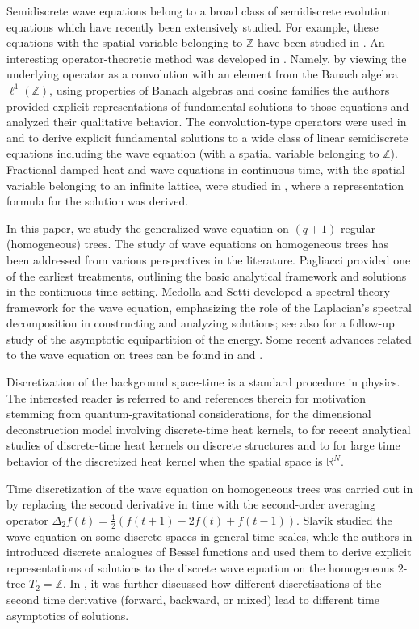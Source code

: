 \documentclass[12pt]{amsart}
\numberwithin{equation}{section}
\theoremstyle{boldremark}
\begin{document}
Semidiscrete wave equations belong to a broad class of semidiscrete evolution equations which have recently been extensively studied. For example, these equations with the spatial variable belonging to $\mathbb Z$ have been studied in \cite{G-CLM21, LM-A23, LM-A24}. An interesting operator-theoretic method was developed in \cite{G-CLM21}. Namely, by viewing the underlying operator as a convolution with an element from the Banach algebra $\ell^1(\mathbb Z)$, using properties of Banach algebras and cosine families the authors provided explicit representations of fundamental solutions to those equations and analyzed their qualitative behavior. The convolution-type operators were used in \cite{LM-A23} and \cite{LM-A24} to derive explicit fundamental solutions to a wide class of linear semidiscrete equations including the wave equation (with a spatial variable belonging to $\mathbb Z$). Fractional damped heat and wave equations in continuous time, with the spatial variable belonging to an infinite lattice, were studied in \cite{G-C25}, where a representation formula for the solution was derived.

In this paper, we study the generalized wave equation on $(q+1)$-regular (homogeneous) trees.
The study of wave equations on homogeneous trees has been addressed from various perspectives in the literature. Pagliacci \cite{P93} provided one of the earliest treatments, outlining the basic analytical framework and solutions in the continuous-time setting. Medolla and Setti \cite{MS99} developed a spectral theory framework for the wave equation, emphasizing the role of the Laplacian’s spectral decomposition in constructing and analyzing solutions; see also \cite{Me99} for a follow-up study of the asymptotic equipartition of the energy. Some recent advances related to the wave equation on trees can be found in \cite{TS16} and \cite{CNT23}.

Discretization of the background space-time is a standard procedure in physics. The interested reader is referred to \cite{tH16} and references therein for motivation stemming from quantum-gravitational considerations, \cite{KS22} for the dimensional deconstruction model involving discrete-time heat kernels, to \cite{AG-CR23, CKSS25, DG-CR26} for recent analytical studies of discrete-time heat kernels on discrete structures and to \cite{AAD22} for large time behavior of the discretized heat kernel when the spatial space is $\mathbb R^N$.

\medskip

Time discretization of the wave equation on homogeneous trees was carried out in \cite{CP94} by replacing the second derivative in time with the second-order averaging operator $\Delta_2 f(t)= \frac{1}{2}(f(t+1)-2f(t)+f(t-1))$. Slav\'ik \cite{Slav17, Slav18} studied the wave equation on some discrete spaces in general time scales, while the authors in \cite{BSS24} introduced discrete analogues of Bessel functions and used them to derive explicit representations of solutions to the discrete wave equation on the homogeneous $2$-tree $T_2=\mathbb{Z}$. In \cite{BSS24}, it was further discussed how different discretisations of the second time derivative (forward, backward, or mixed) lead to different time asymptotics of solutions.
\end{document}
